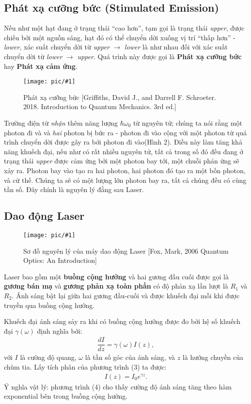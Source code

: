 \documentclass{article}
\newcommand{\image}[2]{
	\begin{figure}[h!]
		\centering
		\texttt{[image: pic/\#1]}
		\caption{#2}
	\end{figure}
}
\newcommand{\f}[2]{\dfrac{#1}{#2}}
\begin{document}
\subsection{Phát xạ cưỡng bức (Stimulated Emission)}
Nếu như một hạt đang ở trạng thái ``cao hơn'', tạm gọi là trạng thái \textit{upper}, được chiếu bởi một nguồn sáng, hạt đó có thể chuyển dời xuống vị trí ``thấp hơn'' - \textit{lower}, xác suất chuyển dời từ \textit{upper} $\rightarrow$ \textit{lower} là như nhau đối với xác suất chuyển dời từ \textit{lower} $\rightarrow$ \textit{upper}. Quá trình này được gọi là \textbf{Phát xạ cưỡng bức} hay \textbf{Phát xạ cảm ứng}.
\image{stimulatedemission.png}{Phát xạ cưỡng bức [Griffiths, David J., and Darrell F. Schroeter. 2018. Introduction to Quantum Mechanics. 3rd ed.]}

Trường điện từ \textit{nhận} thêm năng lượng $\hbar \omega_0$ từ nguyên tử; chúng ta nói rằng một photon đi và và \textit{hai} photon bị bức ra - photon đi vào cộng với một photon từ quá trình chuyển dời được gây ra bởi photon đi vào(Hình 2). Điều này làm tăng khả năng khuếch đại, nếu như có rất nhiều nguyên tử, tất cả trong số đó đều đang ở trạng thái \textit{upper} được cảm ứng bởi một photon bay tới, một chuỗi phản ứng sẽ xảy ra. Photon bay vào tạo ra hai photon, hai photon đó tạo ra một bốn photon, và cứ thế. Chúng ta sẽ có một lượng lớn photon bay ra, tất cả chúng đều có cùng tần số. Đây chính là nguyên lý đằng sau Laser.
\subsection{Dao động Laser}
\image{fig4.8.png}{Sơ đồ nguyên lý của máy dao động Laser [Fox, Mark, 2006 Quantum Optics: An Introduction]}

Laser bao gồm một \textbf{buồng cộng hưởng} và hai gương đầu cuối được gọi là \textbf{gương bán mạ} và \textbf{gương phản xạ toàn phần} có độ phản xạ lần lượt là $R_1$ và $R_2$. Ánh sáng bật lại giữa hai gương đầu-cuối và được khuếch đại mỗi khi được truyền qua buồng cộng hưởng.

Khuếch đại ánh sáng sảy ra khi có buồng cộng hưởng được đo bởi hệ số khuếch đại $\gamma(\omega)$ định nghĩa bởi:
\begin{align}
	\f{d I}{d z} = \gamma(\omega) I(z),
\end{align}
với	$I$ là cường độ quang, $\omega$ là tần số góc của ánh sáng, và $z$ là hướng chuyền của chùm tia. Lấy tích phân của phương trình (3) ta được:
\begin{align}
	I(z) = I_0 e^{\gamma z}.
\end{align}
Ý nghĩa vật lý: phương trình (4) cho thấy cường độ ánh sáng tăng theo hàm exponential bên trong buồng cộng hưởng.
\end{document}

